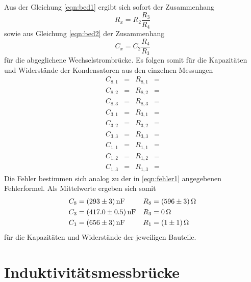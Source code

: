 Aus der Gleichung \ref{eqn:bed1} ergibt sich sofort der Zusammenhang
\begin{equation}
  R_x = R_2 \frac{R_3}{R_4}
\end{equation}
sowie aus Gleichung \ref{eqn:bed2} der Zusammenhang
\begin{equation}
  C_x = C_2 \frac{R_4}{R_3}
\end{equation}
für die abgeglichene Wechselstrombrücke.
Es folgen somit für die Kapazitäten und Widerstände der Kondensatoren aus den einzelnen Messungen
\begin{align*}
  C_{8,1}   &=  & R_{8,1} &= \\
  C_{8,2}   &=  & R_{8,2} &= \\
  C_{8,3}   &=  & R_{8,3} &= 
\end{align*}
\begin{align*}
  C_{3,1}   &=  & R_{3,1} &= \\
  C_{3,2}   &=  & R_{3,2} &= \\
  C_{3,3}   &=  & R_{3,3} &= 
\end{align*}
\begin{align*}
  C_{1,1}   &=  & R_{1,1} &= \\
  C_{1,2}   &=  & R_{1,2} &= \\
  C_{1,3}   &=  & R_{1,3} &= 
\end{align*}
Die Fehler bestimmen sich analog zu der in \ref{eqn:fehler1} angegebenen Fehlerformel.
Als Mittelwerte ergeben sich somit
\begin{align*}
  C_{8}   &= \SI{293 +- 3}{\nano\farad} & R_{8} &= \SI{596 +- 3}{\ohm}\\
  C_{3}   &= \SI{417 +- 0.5}{\nano\farad} & R_{3} &= \SI{0}{\ohm}\\
  C_{1}   &= \SI{656 +- 3}{\nano\farad} & R_{1} &= \SI{1 +- 1}{\ohm}
\end{align*}
für die Kapazitäten und Widerstände der jeweiligen Bauteile.

\section{Induktivitätsmessbrücke}

